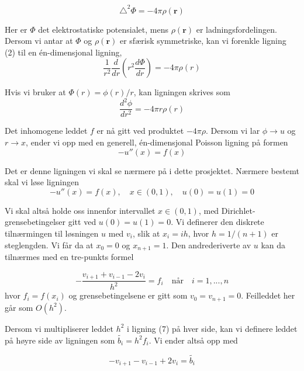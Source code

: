 \documentclass{article}
\begin{document}
\begin{equation}
\triangle^2 \Phi = -4\pi\rho(\textbf{r})
\end{equation}

Her er $\Phi$ det elektrostatiske potensialet, mens $\rho (\textbf{r})$ er ladningsfordelingen.
Dersom vi antar at $\Phi$ og $\rho(\textbf{r})$ er sfærisk symmetriske, kan vi forenkle ligning (2) til en én-dimensjonal ligning,
\begin{equation}
\frac{1}{r^2}\frac{d}{dr}\left(r^2\frac{d\Phi}{dr}\right) = -4\pi\rho(r)
\end{equation}

Hvis vi bruker at  $\Phi(r) = \phi(r)/r$, kan ligningen skrives som
\begin{equation}
\frac{d^2\phi}{dr^2} = -4\pi r\rho(r)
\end{equation}

Det inhomogene leddet $f$ er nå gitt ved produktet $-4\pi\rho$. Dersom vi lar $\phi \rightarrow u$ og $r \rightarrow x$, ender vi opp med en generell, én-dimensjonal Poisson ligning på formen 
\begin{equation}
-u''(x) = f(x)
\end{equation}

Det er denne ligningen vi skal se nærmere på i dette prosjektet. Nærmere bestemt skal vi løse ligningen
\begin{equation}
-u''(x) = f(x),\quad  x \in (0,1), \quad    u(0) = u(1) = 0
\end{equation}

Vi skal altså holde oss innenfor intervallet $x \in (0,1)$, med Dirichlet-grensebetingelser gitt ved $u(0) = u(1) = 0$. Vi definerer den diskrete tilnærmingen til løsningen $u$ med $v_i$, slik at $x_i = ih$, hvor $h = 1/(n+1)$ er steglengden. Vi får da at $x_0 = 0$ og $x_{n+1} = 1$. Den andrederiverte av $u$ kan da tilnærmes med en tre-punkts formel

\begin{equation}
-\frac{v_{i+1} + v_{i-1} - 2v_i}{h^2} = f_i \quad \textrm{når} \quad i = 1,...,n
\end{equation}
hvor $f_i = f(x_i)$ og grensebetingelsene er gitt som $v_0 = v_{n+1} = 0$. Feilleddet her går som $O(h^2)$.

Dersom vi multipliserer leddet $h^2$ i ligning (7) på hver side, kan vi definere leddet på høyre side av ligningen som $\tilde{b_i} = h^2f_i$. Vi ender altså opp med 

\begin{equation}
- v_{i+1} - v_{i-1} + 2v_i = \tilde{b_i}
\end{equation}
\end{document}
